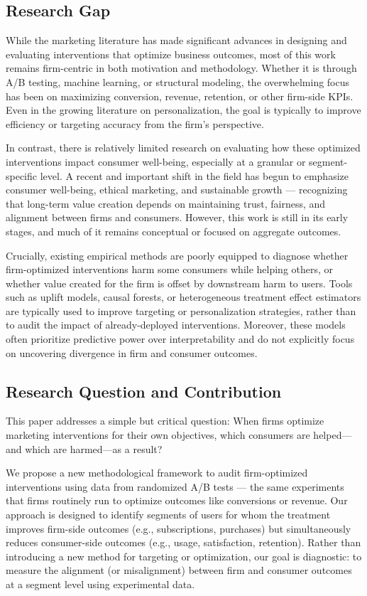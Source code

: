 \documentclass[11pt,letterpaper,english]{article}
\theoremstyle{definition}
\theoremstyle{definition}
\begin{document}
\begin{bibunit}
\subsection{Research Gap}
While the marketing literature has made significant advances in designing and evaluating interventions that optimize business outcomes, most of this work remains firm-centric in both motivation and methodology. Whether it is through A/B testing, machine learning, or structural modeling, the overwhelming focus has been on maximizing conversion, revenue, retention, or other firm-side KPIs. Even in the growing literature on personalization, the goal is typically to improve efficiency or targeting accuracy from the firm's perspective.

In contrast, there is relatively limited research on evaluating how these optimized interventions impact consumer well-being, especially at a granular or segment-specific level. A recent and important shift in the field has begun to emphasize consumer well-being, ethical marketing, and sustainable growth — recognizing that long-term value creation depends on maintaining trust, fairness, and alignment between firms and consumers. However, this work is still in its early stages, and much of it remains conceptual or focused on aggregate outcomes.

Crucially, existing empirical methods are poorly equipped to diagnose whether firm-optimized interventions harm some consumers while helping others, or whether value created for the firm is offset by downstream harm to users. Tools such as uplift models, causal forests, or heterogeneous treatment effect estimators are typically used to improve targeting or personalization strategies, rather than to audit the impact of already-deployed interventions. Moreover, these models often prioritize predictive power over interpretability and do not explicitly focus on uncovering divergence in firm and consumer outcomes.

\subsection{Research Question and Contribution}
This paper addresses a simple but critical question:
When firms optimize marketing interventions for their own objectives, which consumers are helped—and which are harmed—as a result?

We propose a new methodological framework to audit firm-optimized interventions using data from randomized A/B tests — the same experiments that firms routinely run to optimize outcomes like conversions or revenue. Our approach is designed to identify segments of users for whom the treatment improves firm-side outcomes (e.g., subscriptions, purchases) but simultaneously reduces consumer-side outcomes (e.g., usage, satisfaction, retention). Rather than introducing a new method for targeting or optimization, our goal is diagnostic: to measure the alignment (or misalignment) between firm and consumer outcomes at a segment level using experimental data.


\end{bibunit}
\end{document}
